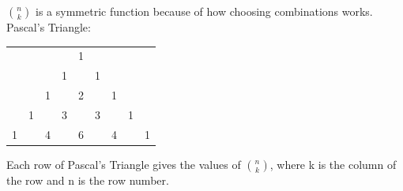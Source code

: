 \documentclass{article}
\begin{document}
\begin{enumerate}
$n\choose k$ is a symmetric function because of how choosing combinations works. Pascal's Triangle:\\
\begin{tabular}{ccccccccc}
	\hfill	&\hfill	&\hfill	& \hfill 	& 1	&\hfill	&\hfill	&\hfill	&\hfill\\
	\hfill	&\hfill	&\hfill	&1	& \hfill	& 1	& \hfill	&\hfill	&\hfill\\
	\hfill	&\hfill	&1	&\hfill	&2	&\hfill	&1	&\hfill	&\hfill\\
	\hfill	&1	&\hfill	&3	&\hfill	&3	&\hfill	&1	&\hfill\\
	1	&\hfill	&4	&\hfill	&6	&\hfill	&4	&\hfill	&1
\end{tabular}

Each row of Pascal's Triangle gives the values of $n\choose k$, where k is the column of the row and n is the row number. 

\end{enumerate}
\end{document}
